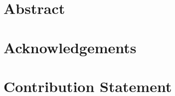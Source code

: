\documentclass[11pt, twoside, openright]{book}
\theoremstyle{definition}
\newcommand{\markmargin}{}
\newlength{\spiff}
\newif\ifcontributionStatementOnly
\begin{document}
\newpage
\section*{Abstract}
\label{preamble:intro}


\cleardoublepage
\section*{Acknowledgements}
\label{preamble:acknowledgements}


\newpage

\fi  %
\section*{Contribution Statement}
\label{preamble:contributionstatement}


\ifcontributionStatementOnly
\else

\setcounter{tocdepth}{1}
\tableofcontents

\mainmatter



\renewcommand{\thesection}{\arabic{section}}
\renewcommand{\thefigure}{\arabic{figure}}
\renewcommand{\thetable}{\arabic{table}}
\renewcommand{\thechapter}{\Roman{chapter}}
\renewcommand{\theHchapter}{publication.\Roman{chapter}}
\renewcommand{\theHsection}{\theHchapter.\arabic{section}}
\renewcommand{\theequation}{\arabic{equation}}

\newlength{\apa}
\setlength{\apa}{0cm}
\setlength{\spiff}{0cm}

\renewcommand{\markmargin}{%
\begin{tikzpicture}[remember picture, overlay]%
\node at (current page text area.north -| current page.east) [
  anchor = north east,
  yshift = -\apa,
  rectangle,
  fill = black,
  minimum width = 1.6cm,
  minimum height = 2cm,
  inner sep = 0pt,
  outer sep = 0]
  (rec) {};
\node at (rec.south west) [
  anchor = north west,
  text width = 2cm,
  text height = 0.4cm,
  inner sep = 0,
  outer sep = 0,
  text centered,
  font=\sffamily\bfseries\small,
  color=white,
  rotate=90]
  {Paper~\thechapter};
\end{tikzpicture}%
}
\end{document}
